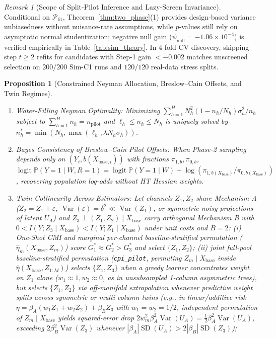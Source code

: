 \documentclass[11pt]{article}
\newtheorem{proposition}{Proposition}
\theoremstyle{remark}
\newtheorem{remark}{Remark}
\begin{document}
\begin{remark}[Scope of Split-Pilot Inference and Lazy-Screen Invariance]
\label{rem:split_pilot}
Conditional on $\mathcal{P}_{\text{fit}}$, Theorem~\ref{thm:two_phase}(1) provides design-based variance unbiasedness without nuisance-rate assumptions, while $p$-values still rely on asymptotic normal studentization; negative null gain ($\bar{\psi}_{\text{null}} = -1.06 \times 10^{-4}$) is verified empirically in Table~\ref{tab:sim_theory}. In $4$-fold CV discovery, skipping step $t \ge 2$ refits for candidates with Step-1 gain $<-0.002$ matches unscreened selection on $200/200$ Sim-C1 runs and $120/120$ real-data stress splits.
\end{remark}

\begin{proposition}[Constrained Neyman Allocation, Breslow--Cain Offsets, and Twin Regimes]
\label{prop:neyman_twins}
\leavevmode
\begin{enumerate}
  \item \emph{Water-Filling Neyman Optimality:} Minimizing $\sum_{h=1}^H N_h^2 (1 - n_h/N_h)\sigma_h^2 / n_h$ subject to $\sum_{h=1}^H n_h = n_{\text{pilot}}$ and $\ell_h \le n_h \le N_h$ is uniquely solved by $n_h^* = \min(N_h, \max(\ell_h, \lambda N_h \sigma_h))$.
  \item \emph{Bayes Consistency of Breslow--Cain Pilot Offsets:} When Phase-2 sampling depends only on $(Y_i, b(X_{\text{base},i}))$ with fractions $\pi_{1,b}, \pi_{0,b}$, $\operatorname{logit}\mathbb{P}(Y=1 \mid W, R=1) = \operatorname{logit}\mathbb{P}(Y=1 \mid W) + \log(\pi_{1,b(X_{\text{base}})} / \pi_{0,b(X_{\text{base}})})$ \citep{breslow1988logistic}, recovering population log-odds without HT Hessian weights.
  \item \emph{Twin Collinearity Across Estimators:} Let channels $Z_1, Z_2$ share Mechanism A ($Z_2 = Z_1 + \varepsilon$, $\operatorname{Var}(\varepsilon) = \delta^2 \ll \operatorname{Var}(Z_1)$, or symmetric noisy projections of latent $U_A$) and $Z_3 \perp (Z_1, Z_2) \mid X_{\text{base}}$ carry orthogonal Mechanism B with $0 < I(Y; Z_3 \mid X_{\text{base}}) < I(Y; Z_1 \mid X_{\text{base}})$ under unit costs and $B = 2$:
  (i) One-Shot CMI and \emph{marginal per-channel} baseline-stratified permutation ($\hat{\eta}_m(X_{\text{base}}, Z_m)$) score $G_1^* \approx G_2^* > G_3^*$ and select $\{Z_1, Z_2\}$;
  (ii) \emph{joint full-pool} baseline-stratified permutation (\texttt{cpi\_pilot}, permuting $Z_m \mid X_{\text{base}}$ inside $\hat{\eta}(X_{\text{base}}, Z_{1:M})$) selects $\{Z_1, Z_3\}$ when a greedy learner concentrates weight on $Z_1$ alone ($w_1 \approx 1, w_2 \approx 0$, as in unsubsampled 1-column asymmetric trees), but selects $\{Z_1, Z_2\}$ via off-manifold extrapolation \citep{hooker2021unrestricted} whenever predictive weight splits across symmetric or multi-column twins (e.g., in linear/additive risk $\eta = \beta_A(w_1 Z_1 + w_2 Z_2) + \beta_B Z_3$ with $w_1 = w_2 = 1/2$, independent permutation of $Z_m \mid X_{\text{base}}$ yields squared-error drop $2 w_m^2 \beta_A^2 \operatorname{Var}(U_A) = \frac{1}{2}\beta_A^2 \operatorname{Var}(U_A)$, exceeding $2\beta_B^2 \operatorname{Var}(Z_3)$ whenever $|\beta_A|\operatorname{SD}(U_A) > 2|\beta_B|\operatorname{SD}(Z_3)$);

\end{enumerate}
\end{proposition}
\end{document}
